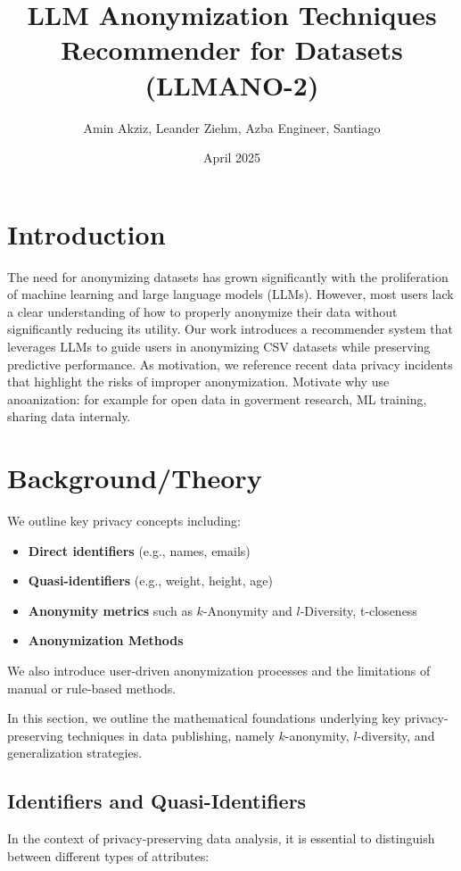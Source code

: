 \documentclass{article}
\title{LLM Anonymization Techniques Recommender for Datasets (LLMANO-2)}
\author{Amin Akziz, Leander Ziehm, Azba Engineer, Santiago}
\date{April 2025}
\begin{document}
\maketitle

\section{Introduction}
The need for anonymizing datasets has grown significantly with the proliferation of machine learning and large language models (LLMs). However, most users lack a clear understanding of how to properly anonymize their data without significantly reducing its utility. Our work introduces a recommender system that leverages LLMs to guide users in anonymizing CSV datasets while preserving predictive performance. As motivation, we reference recent data privacy incidents that highlight the risks of improper anonymization.
Motivate why use anoanization: for example for open data in goverment research, ML training, sharing data internaly.


\section{Background/Theory}
We outline key privacy concepts including:
\begin{itemize}
    \item \textbf{Direct identifiers} (e.g., names, emails)
    \item \textbf{Quasi-identifiers} (e.g., weight, height, age)
    \item \textbf{Anonymity metrics} such as $k$-Anonymity and $l$-Diversity, t-closeness
    \item \textbf{Anonymization Methods}
\end{itemize}
We also introduce user-driven anonymization processes and the limitations of manual or rule-based methods.

In this section, we outline the mathematical foundations underlying key privacy-preserving techniques in data publishing, namely $k$-anonymity, $l$-diversity, and generalization strategies.

\subsection{Identifiers and Quasi-Identifiers}

In the context of privacy-preserving data analysis, it is essential to distinguish between different types of attributes:
\end{document}
